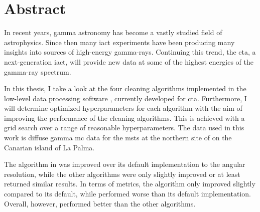 \thispagestyle{plain}

\section*{Abstract}
In recent years, gamma astronomy has become a vastly studied field of astrophysics.
Since then many \gls{iact} experiments have been producing many insights into sources of
high-energy gamma-rays. Continuing this trend, the \gls{cta}, a next-generation \gls{iact},
will provide new data at some of the highest energies of the gamma-ray spectrum.

In this thesis, I take a look at the four cleaning algorithms implemented in the low-level data processing software \ctapipe{},
currently developed for \gls{cta}. Furthermore, I will determine optimized hyperparameters for each algorithm
with the aim of improving the performance of the cleaning algorithms. This is achieved with a grid search
over a range of reasonable hyperparameters. The data used in this work is diffuse gamma \gls{mc} data for
the \glspl{mst} at the northern site of \cta{} on the Canarian island of La Palma.

The \tcc{} algorithm in \ctapipe{} was improved over its default implementation \wrt to the angular
resolution, while the other algorithms were only slightly improved or at least returned similar results.
In terms of metrics, the \tcc{} algorithm only improved slightly compared to its default, while \fact{}
performed worse than its default implementation. Overall, however, \fact{} performed better than the other
algorithms.


